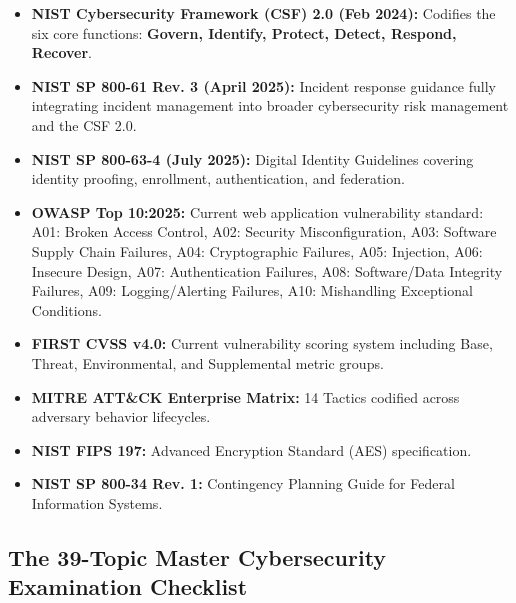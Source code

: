 \begin{itemize}
\item \textbf{NIST Cybersecurity Framework (CSF) 2.0 (Feb 2024):} Codifies the six core functions: \textbf{Govern, Identify, Protect, Detect, Respond, Recover}.
\item \textbf{NIST SP 800-61 Rev. 3 (April 2025):} Incident response guidance fully integrating incident management into broader cybersecurity risk management and the CSF 2.0.
\item \textbf{NIST SP 800-63-4 (July 2025):} Digital Identity Guidelines covering identity proofing, enrollment, authentication, and federation.
\item \textbf{OWASP Top 10:2025:} Current web application vulnerability standard: A01: Broken Access Control, A02: Security Misconfiguration, A03: Software Supply Chain Failures, A04: Cryptographic Failures, A05: Injection, A06: Insecure Design, A07: Authentication Failures, A08: Software/Data Integrity Failures, A09: Logging/Alerting Failures, A10: Mishandling Exceptional Conditions.
\item \textbf{FIRST CVSS v4.0:} Current vulnerability scoring system including Base, Threat, Environmental, and Supplemental metric groups.
\item \textbf{MITRE ATT\&CK Enterprise Matrix:} 14 Tactics codified across adversary behavior lifecycles.
\item \textbf{NIST FIPS 197:} Advanced Encryption Standard (AES) specification.
\item \textbf{NIST SP 800-34 Rev. 1:} Contingency Planning Guide for Federal Information Systems.
\end{itemize}

\subsection{The 39-Topic Master Cybersecurity Examination Checklist}

